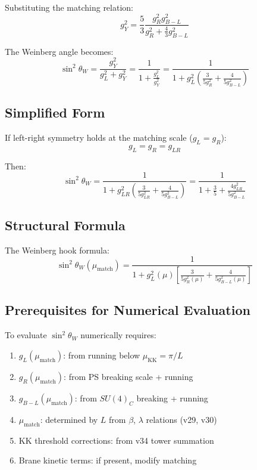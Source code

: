 \documentclass[11pt,a4paper]{article}
\begin{document}
Substituting the matching relation:
\begin{equation}
\label{eq:gy-squared}
g_Y^2 = \frac{5}{3} \frac{g_R^2 g_{B-L}^2}{g_R^2 + \frac{4}{3} g_{B-L}^2}
\end{equation}

The Weinberg angle becomes:
\begin{equation}
\label{eq:weinberg-ps}
\sin^2\theta_W = \frac{g_Y^2}{g_L^2 + g_Y^2}
= \frac{1}{1 + \frac{g_L^2}{g_Y^2}}
= \frac{1}{1 + g_L^2 \left(\frac{3}{5 g_R^2} + \frac{4}{5 g_{B-L}^2}\right)}
\end{equation}

\subsection{Simplified Form}
\label{subsec:weinberg-simplified}

If left-right symmetry holds at the matching scale ($g_L = g_R$):
\begin{equation}
\label{eq:lr-symmetric}
g_L = g_R = g_{LR}
\end{equation}

Then:
\begin{equation}
\label{eq:weinberg-lr}
\sin^2\theta_W = \frac{1}{1 + g_{LR}^2 \left(\frac{3}{5 g_{LR}^2} + \frac{4}{5 g_{B-L}^2}\right)}
= \frac{1}{1 + \frac{3}{5} + \frac{4 g_{LR}^2}{5 g_{B-L}^2}}
\end{equation}

\subsection{Structural Formula}
\label{subsec:weinberg-structural}

The Weinberg hook formula:
\begin{equation}
\label{eq:weinberg-hook}
\boxed{\sin^2\theta_W(\mu_{\text{match}}) = \frac{1}{1 + g_L^2(\mu) \left[\frac{3}{5 g_R^2(\mu)} + \frac{4}{5 g_{B-L}^2(\mu)}\right]}}
\end{equation}

\subsection{Prerequisites for Numerical Evaluation}
\label{subsec:weinberg-prereq}

To evaluate $\sin^2\theta_W$ numerically requires:
\begin{enumerate}
\item $g_L(\mu_{\text{match}})$: from running below $\mu_{\text{KK}} = \pi/L$
\item $g_R(\mu_{\text{match}})$: from PS breaking scale + running
\item $g_{B-L}(\mu_{\text{match}})$: from $SU(4)_C$ breaking + running
\item $\mu_{\text{match}}$: determined by $L$ from $\beta$, $\lambda$ relations (v29, v30)
\item KK threshold corrections: from v34 tower summation
\item Brane kinetic terms: if present, modify matching
\end{enumerate}
\end{document}
